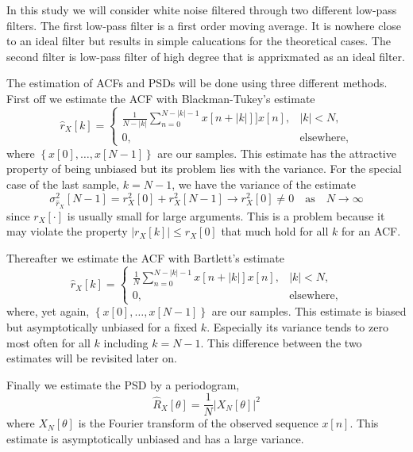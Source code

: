\documentclass[10pt]{article}
\begin{document}
In this study we will consider white noise filtered through two different low-pass filters. The first low-pass filter is a first order moving average. It is nowhere close to an ideal filter but results in simple calucations for the theoretical cases. The second filter is low-pass filter of high degree that is apprixmated as an ideal filter.

The estimation of ACFs and PSDs will be done using three different methods. First off we estimate the ACF with Blackman-Tukey's estimate
\begin{equation*}
  \hat{r}_X[k] = \begin{cases}
    \frac{1}{N-|k|} \sum\limits_{n=0}^{N-|k|-1} x[n+|k|]]x[n], & |k| < N, \\
    0, & \text{elsewhere},
  \end{cases}
\end{equation*}
where $\left\{x[0],\dots,x[N-1]\right\}$ are our samples. This estimate has the attractive property of being unbiased but its problem lies with the variance. For the special case of the last sample, $k=N-1$, we have the variance of the estimate 
\begin{equation*}
  \sigma_{\hat{r}_X}^2[N-1] = r_X^2[0] + r_X^2[N-1] \rightarrow r_X^2[0] \neq 0\quad \text{as}\quad N \rightarrow \infty
\end{equation*}
since $r_X[\cdot]$ is usually small for large arguments. This is a problem because it may violate the property $|r_X[k]|\leq r_X[0]$ that much hold for all $k$ for an ACF. 

Thereafter we estimate the ACF with Bartlett's estimate
\begin{equation*}
  \hat{r}_X[k] = \begin{cases}
    \frac{1}{N}\sum\limits_{n=0}^{N-|k|-1} x[n+|k|]x[n], & |k| < N, \\
    0, & \text{elsewhere},
  \end{cases}
\end{equation*}
where, yet again, $\left\{x[0],\dots,x[N-1]\right\}$ are our samples. This estimate is biased but asymptotically unbiased for a fixed $k$. Especially its variance tends to zero most often for all $k$ including $k = N-1$. This difference between the two estimates will be revisited later on.

Finally we estimate the PSD by a periodogram,
\begin{equation*}
  \hat{R}_X[\theta] = \frac{1}{N}|X_N[\theta]|^2
\end{equation*}
where $X_N[\theta]$ is the Fourier transform of the observed sequence $x[n]$. This estimate is asymptotically unbiased and has a large variance. 
\end{document}

